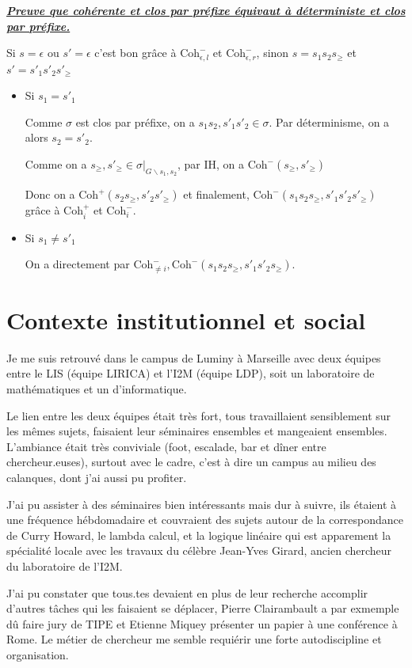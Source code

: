 \documentclass[a4paper,12pt]{article}
\renewenvironment{leftbar}{
  \def\FrameCommand{\vrule width 1pt \hspace{10pt}}
  \MakeFramed {\advance\hsize-\width \FrameRestore}
\setlength{\parskip}{10pt}}
 {\endMakeFramed}
\newenvironment{answernopage}[1]
{
  \vspace{0.5cm} \noindent
  \textbf{\textit{\uline{#1}}}
  \begin{leftbar}
}
{
    \end{leftbar}\vspace{0.2cm}
}
\begin{document}
\begin{answernopage}{Preuve que cohérente et clos par préfixe équivaut à déterministe et clos par préfixe.}
Si $s=\epsilon$ ou $s'=\epsilon$ c'est bon grâce à
$\text{Coh}^-_{\epsilon, l}$ et $\text{Coh}^-_{\epsilon, r}$, sinon
$s = s_1 s_2 s_\geq$ et $s' = s'_1 s'_2 s'_\geq$
\begin{itemize}
\item Si $s_1 = s'_1$

Comme $\sigma$ est clos par préfixe, on a $s_1 s_2, s'_1 s'_2 \in \sigma$.
Par déterminisme, on a alors $s_2 = s'_2$.

Comme on a $s_\geq, s'_\geq \in \sigma |_{G\backslash s_1,s_2}$, par IH,
on a $\text{Coh}^-(s_\geq, s'_\geq)$

Donc on a $\text{Coh}^+(s_2 s_\geq, s'_2 s'_\geq)$ et finalement,
$\text{Coh}^-(s_1 s_2 s_\geq, s'_1 s'_2 s'_\geq)$ grâce à
$\text{Coh}_i^+$ et $\text{Coh}_i^-$.


\item Si $s_1 \neq s'_1$

On a directement par $\text{Coh}_{\neq i}^-, \text{Coh}^-(s_1 s_2 s_\geq, s'_1 s'_2 s_\geq)$.

\end{itemize}
\end{answernopage}

\newpage
\section{Contexte institutionnel et social}

Je me suis retrouvé dans le campus de Luminy à Marseille avec deux équipes entre
le LIS (équipe LIRICA) et l'I2M (équipe LDP), soit un laboratoire de mathématiques
et un d'informatique.

Le lien entre les deux équipes était très fort, tous travaillaient sensiblement
sur les mêmes sujets, faisaient leur séminaires ensembles et mangeaient ensembles.
L'ambiance était très conviviale (foot, escalade, bar et dîner entre
chercheur.euses),
surtout avec le cadre, c'est à dire un campus au milieu des calanques,
dont j'ai aussi pu profiter.

J'ai pu assister à des séminaires bien intéressants mais dur à suivre, ils
étaient à une fréquence hébdomadaire et couvraient des sujets autour
de la correspondance de Curry Howard, le lambda calcul, et la logique linéaire
qui est apparement la spécialité locale avec les travaux du célèbre
Jean-Yves Girard, ancien chercheur du laboratoire de l'I2M.

J'ai pu constater que tous.tes devaient en plus de leur recherche accomplir
d'autres tâches qui les faisaient se déplacer, Pierre Clairambault a par
exmemple dû faire jury de TIPE et Etienne Miquey présenter un papier à une
conférence à Rome. Le métier de chercheur me semble requiérir une forte
autodiscipline et organisation.

\printbibliography
\end{document}

